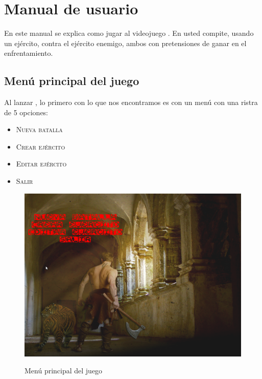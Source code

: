 %


\chapter{Manual de usuario}
\label{manual}

En este manual se explica como jugar al videojuego
\gomf. En \gom usted compite, usando un ejército, contra el
ejército enemigo, ambos con pretensiones de ganar en el
enfrentamiento.

\section*{Menú principal del juego}
Al lanzar \gomf, lo primero con lo que nos encontramos es con
un menú con una ristra de 5 opciones:

\begin{itemize}
\item \textsc{Nueva batalla}
\item \textsc{Crear ejército}
\item \textsc{Editar ejército}
\item \textsc{Salir}
\end{itemize}

\begin{figure}[h]
\centering
\includegraphics[scale=.4]{./imagenes/menuprincipal.png}
\label{fig:menuprincipal}
\caption{Menú principal del juego}
\end{figure}

